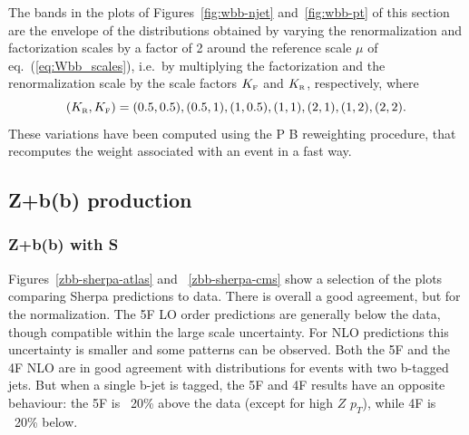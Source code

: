 \documentclass[11pt]{cernrep}
\newcommand{\Sherpa}{S\protect\scalebox{0.8}{HERPA}\xspace}
\newcommand{\pt}{\ensuremath{p_{T}}\xspace}
\newcommand\KRA{K_{\scriptscriptstyle \rm R}}
\newcommand\KFA{K_{\scriptscriptstyle \rm F}}
\newcommand{\POWHEGBOX}{P\protect\scalebox{0.8}{OWHEG} B\protect\scalebox{0.8}{OX}\xspace}
\begin{document}
\begin{enumerate}
The bands in the plots of Figures~\ref{fig:wbb-njet}
and~\ref{fig:wbb-pt} of this section are the envelope of the
distributions obtained by varying the renormalization and factorization
scales by a factor of 2 around the reference scale $\mu$ of
eq.~(\ref{eq:Wbb_scales}), i.e.~by multiplying the factorization and the
renormalization scale by the scale factors $\KFA$ and $\KRA$, respectively,
where
\begin{equation}
\label{eq:KRA_KFA}
(\KRA,\KFA)=(0.5,0.5),  (0.5,1), (1,0.5), (1,1),(2,1),(1,2),(2,2).
\end{equation}
These variations have been computed using the \POWHEGBOX{} reweighting
procedure, that recomputes the weight associated with an event in a fast way.
\end{enumerate}

\clearpage

\subsection{Z+b(b) production \label{Zbb}}

\subsubsection*{Z+b(b) with \Sherpa}

Figures~\ref{zbb-sherpa-atlas} and ~\ref{zbb-sherpa-cms} show a selection of
the plots comparing Sherpa predictions to data.  There is overall a good
agreement, but for the normalization. The 5F LO order predictions are
generally below the data, though compatible within the large scale
uncertainty. For NLO predictions this uncertainty is smaller and some
patterns can be observed. Both the 5F and the 4F NLO are in good agreement
with distributions for events with two b-tagged jets.  But when a single
b-jet is tagged, the 5F and 4F results have an opposite behaviour: the 5F is
~20\% above the data (except for high $Z$ \pt), while 4F is ~20\% below.
\end{document}
